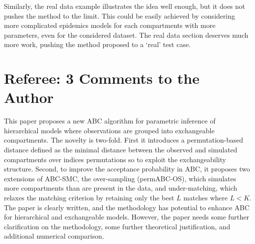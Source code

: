 \documentclass[10.5pt]{article}
\begin{document}
Similarly, the real data example illustrates the idea well enough, but it does not pushes the method to the limit. This could be easily achieved by considering more complicated epidemics models for each compartments with more parameters, even for the considered dataset. The real data section deserves much more work, pushing the method proposed to a ‘real’ test case. 

\section*{Referee: 3 Comments to the Author}

This paper proposes a new ABC algorithm for parametric inference of hierarchical models where observations are grouped into exchangeable compartments. The novelty is two-fold. First it introduces a permutation-based distance defined as the minimal distance between the observed and simulated compartments over indices permutations so to exploit the exchangeability structure. Second, to improve the acceptance probability in ABC, it proposes two extensions of ABC-SMC, the over-sampling (permABC-OS), which simulates more compartments than are present in the data, and under-matching, which relaxes the matching criterion by retaining only the best $L$ matches where $L<K$. The paper is clearly written, and the methodology has potential to enhance ABC for hierarchical and exchangeable models. However, the paper needs some further clarification on the methodology, some further theoretical justification, and additional numerical comparison.
\end{document}
